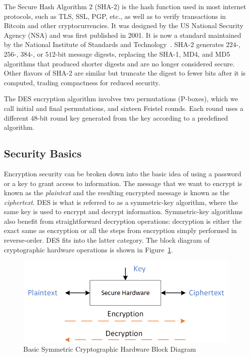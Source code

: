 \documentclass{article}
\begin{document}
The Secure Hash Algorithm 2 (SHA-2) is the hash function used in most
internet protocols, such as TLS, SSL, PGP, etc., as well as to verify
transactions in Bitcoin and other cryptocurrencies. It was designed by
the US National Security Agency (NSA) and was first published in
2001. It is now a standard maintained by the National Institute of
Standards and Technology~\cite{nist-sha}.
SHA-2 generates $224$-, $256$-, $384$-, or $512$-bit message digests,
replacing the SHA-1, MD4, and MD5 algorithms that produced shorter
digests and are no longer considered secure. 
Other flavors of SHA-2 are similar but truncate the digest to
fewer bits after it is computed, trading compactness for reduced
security. 







The DES encryption algorithm involves 
two permutations (P-boxes), which we call initial and final permutations, and
sixteen Feistel rounds.
Each round uses a different $48$-bit round key generated
from the key according to a predefined algorithm.

\subsection{Security Basics}

Encryption security can be broken down into the basic idea of using a
password
or a key to grant access to information.  The message that we want to
encrypt is
known as the \textit{plaintext} and the resulting encrypted message is
known as the
\textit{ciphertext}.  DES is what is referred to as a symmetric-key
algorithm, where the
same key is used to encrypt and decrypt information.  Symmetric-key
algorithms
also benefit from straightforward decryption operations: decryption is either
the exact same as encryption or all the steps from encryption simply performed
in reverse-order.  DES fits into the latter category.  The block diagram of
cryptographic hardware operations is shown in
Figure~\ref{crypto_hw.png}.
\begin{figure}
  \centering
  \includegraphics[scale=1.0]{crypto_hw.png}
  \caption{Basic Symmetric Cryptographic Hardware Block Diagram}
  \label{crypto_hw.png}
\end{figure}
\end{document}
